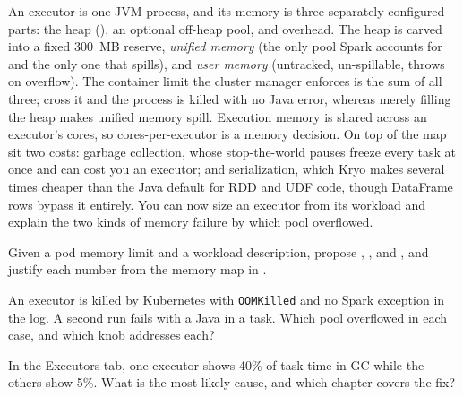An executor is one JVM process, and its memory is three separately configured
parts: the heap (), an optional off-heap pool, and
overhead. The heap is carved into a fixed 300~MB reserve, \emph{unified memory}
(the only pool Spark accounts for and the only one that spills), and \emph{user
memory} (untracked, un-spillable, throws on overflow). The container limit the
cluster manager enforces is the sum of all three; cross it and the process is
killed with no Java error, whereas merely filling the heap makes unified memory
spill. Execution memory is shared across an executor's cores, so cores-per-executor
is a memory decision. On top of the map sit two costs: garbage collection, whose
stop-the-world pauses freeze every task at once and can cost you an executor; and
serialization, which Kryo makes several times cheaper than the Java default for
RDD and UDF code, though DataFrame rows bypass it entirely. You can now size an
executor from its workload and explain the two kinds of memory failure by which
pool overflowed.

\exercisehead
\begin{exercises}
\item Given a pod memory limit and a workload description, propose
      , , and
      , and justify each number from the
      memory map in .
\item An executor is killed by Kubernetes with \texttt{OOMKilled} and no Spark
      exception in the log. A second run fails with a Java
       in a task. Which pool overflowed in each case,
      and which knob addresses each?
\item In the Executors tab, one executor shows 40\% of task time in GC while the
      others show 5\%. What is the most likely cause, and which chapter covers
      the fix?
\end{exercises}
